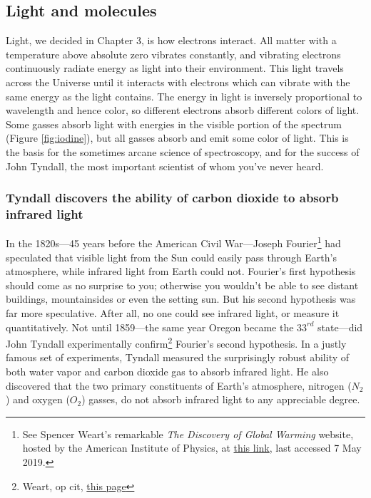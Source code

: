 \documentclass[amstex,12pt]{book}
\begin{document}
\subsection{Light and molecules}
Light, we decided in Chapter 3, is how electrons interact. All matter with a temperature above absolute zero vibrates constantly, and vibrating electrons continuously radiate energy as light into their environment. This light travels across the Universe until it interacts with electrons which can vibrate with the same energy as the light contains. The energy in light is inversely proportional to wavelength and hence color, so different electrons absorb different colors of light. Some gasses absorb light with energies in the visible portion of the spectrum (Figure \ref{fig:iodine}), but all gasses absorb and emit some color of light. This is the basis for the sometimes arcane science of spectroscopy, and for the success of John Tyndall, the most important scientist of whom you've never heard.\\ 
\subsubsection{Tyndall discovers the ability of carbon dioxide to absorb infrared light} \label{tyndal}
In the 1820s---45 years before the American Civil War---Joseph Fourier\footnote{See Spencer Weart's remarkable \textit{The Discovery of Global Warming} website, hosted by the American Institute of Physics, at \href{https://history.aip.org/climate/index.htm}{this link}, last accessed 7 May 2019.} had speculated that visible light from the Sun could easily pass through Earth's atmosphere, while infrared light from Earth could not. Fourier’s first hypothesis should come as no surprise to you; otherwise you wouldn't be able to see distant buildings, mountainsides or even the setting sun. But his second hypothesis was far more speculative. After all, no one could see infrared light, or measure it quantitatively. Not until 1859---the same year Oregon became the $33^{rd}$ state---did John Tyndall experimentally confirm\footnote{Weart, op cit, \href{http://www.aip.org/history/climate/co2.htm}{this page}} Fourier's second hypothesis. In a justly famous set of experiments, Tyndall measured the surprisingly robust ability of both water vapor and carbon dioxide gas to absorb infrared light. He also discovered that the two primary constituents of Earth's atmosphere, nitrogen ($N_2$) and oxygen ($O_2$) gasses, do not absorb infrared light to any appreciable degree.\\
\end{document}
